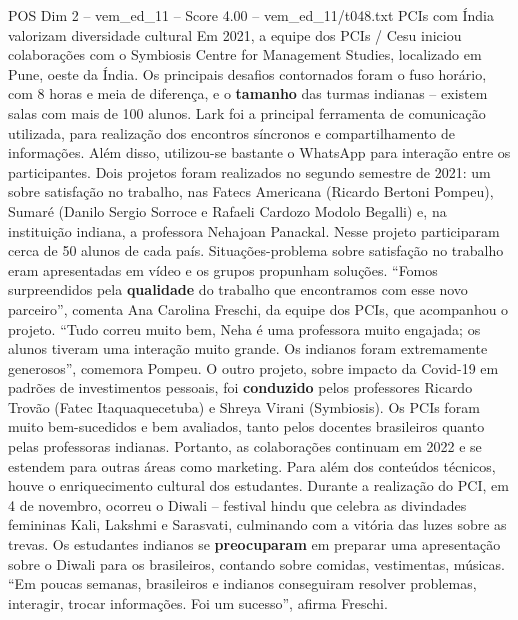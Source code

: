 \begin{textsample}{POS Dim 2 – vem\_ed\_11 – Score 4.00 – vem\_ed\_11/t048.txt}  \label{ex:f2_pos_155}
PCIs com Índia valorizam diversidade cultural Em 2021, a equipe dos PCIs / Cesu iniciou colaborações com o Symbiosis Centre for Management Studies, localizado em Pune, oeste da Índia.
Os principais desafios contornados foram o fuso horário, com 8 horas e meia de diferença, e o \textbf{tamanho} das turmas indianas – existem salas com mais de 100 alunos.
Lark foi a principal ferramenta de comunicação utilizada, para realização dos encontros síncronos e compartilhamento de informações.
Além disso, utilizou-se bastante o WhatsApp para interação entre os participantes.
Dois projetos foram realizados no segundo semestre de 2021: um sobre satisfação no trabalho, nas Fatecs Americana (Ricardo Bertoni Pompeu), Sumaré (Danilo Sergio Sorroce e Rafaeli Cardozo Modolo Begalli) e, na instituição indiana, a professora Nehajoan Panackal.
Nesse projeto participaram cerca de 50 alunos de cada país.
Situações-problema sobre satisfação no trabalho eram apresentadas em vídeo e os grupos propunham soluções. “Fomos surpreendidos pela \textbf{qualidade} do trabalho que encontramos com esse novo parceiro”, comenta Ana Carolina Freschi, da equipe dos PCIs, que acompanhou o projeto. “Tudo correu muito bem, Neha é uma professora muito engajada; os alunos tiveram uma interação muito grande.
Os indianos foram extremamente generosos”, comemora Pompeu.
O outro projeto, sobre impacto da Covid-19 em padrões de investimentos pessoais, foi \textbf{conduzido} pelos professores Ricardo Trovão (Fatec Itaquaquecetuba) e Shreya Virani (Symbiosis).
Os PCIs foram muito bem-sucedidos e bem avaliados, tanto pelos docentes brasileiros quanto pelas professoras indianas.
Portanto, as colaborações continuam em 2022 e se estendem para outras áreas como marketing.
Para além dos conteúdos técnicos, houve o enriquecimento cultural dos estudantes.
Durante a realização do PCI, em 4 de novembro, ocorreu o Diwali – festival hindu que celebra as divindades femininas Kali, Lakshmi e Sarasvati, culminando com a vitória das luzes sobre as trevas.
Os estudantes indianos se \textbf{preocuparam} em preparar uma apresentação sobre o Diwali para os brasileiros, contando sobre comidas, vestimentas, músicas. “Em poucas semanas, brasileiros e indianos conseguiram resolver problemas, interagir, trocar informações.
Foi um sucesso”, afirma Freschi.

\end{textsample}
